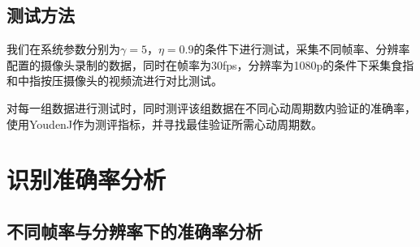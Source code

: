 \subsection{测试方法}
{我们在系统参数分别为$\gamma=5$，$\eta=0.9$的条件下进行测试，采集不同帧率、分辨率配置的摄像头录制的数据，同时在帧率为30fps，分辨率为1080p的条件下采集食指和中指按压摄像头的视频流进行对比测试。}
\par
{对每一组数据进行测试时，同时测评该组数据在不同心动周期数内验证的准确率，使用YoudenJ作为测评指标，并寻找最佳验证所需心动周期数。}
\section{识别准确率分析}
\subsection{不同帧率与分辨率下的准确率分析}
